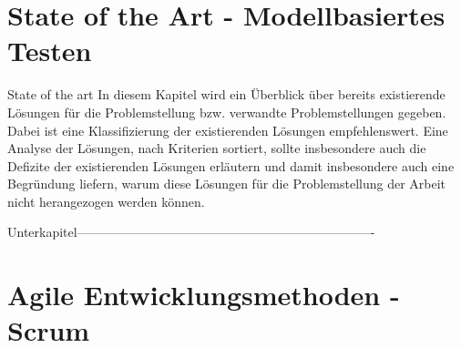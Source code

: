 \section{State of the Art - Modellbasiertes Testen}

State of the art
In diesem Kapitel wird ein Überblick über bereits existierende Lösungen für die Problemstellung bzw. verwandte Problemstellungen gegeben. Dabei ist eine Klassifizierung der existierenden Lösungen empfehlenswert. Eine Analyse der Lösungen, nach Kriterien sortiert, sollte insbesondere auch die Defizite der existierenden Lösungen erläutern und damit insbesondere auch eine Begründung liefern, warum diese Lösungen für die Problemstellung der Arbeit nicht herangezogen werden können.

Unterkapitel----------------------------------------------------------------------

\section{Agile Entwicklungsmethoden - Scrum}

